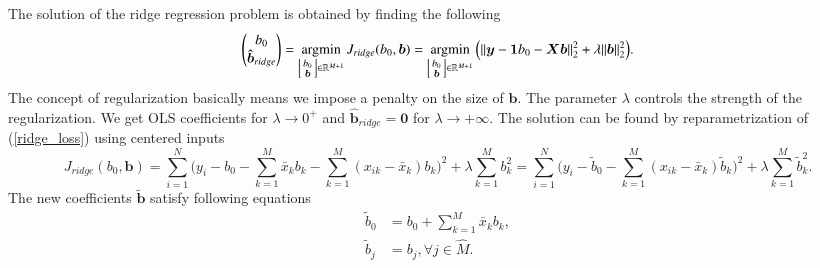 \documentclass[11pt,oneside,czech,american]{book} %
\theoremstyle{plain}
\theoremstyle{definition}
\DeclareMathOperator*{\argmin}{argmin} %
\begin{document}
The solution of the ridge regression problem is obtained by finding the following
\begin{equation}
	\begin{pmatrix}
		b_0 \\
		\bm{\hat{b}}_{ridge}
	\end{pmatrix} = \argmin_{
	\begin{bsmallmatrix}
		b_0 \\
		\bm{b}
	\end{bsmallmatrix} \in \mathbb{R}^{M+1}} J_{ridge}(b_0, \bm{b}) = \argmin_{	\begin{bsmallmatrix}
	b_0 \\
	\bm{b}
\end{bsmallmatrix} \in \mathbb{R}^{M+1}} \Big( \lVert \bm{y} - \bm{1} b_0 -\bm{X}\bm{b}\rVert_{2}^2 + \lambda \lVert \bm{b} \rVert^2_{2} \Big). \label{ridge_regression}
\end{equation}
The concept of regularization basically means we impose a penalty on the size of $\bm{b}$. The parameter $\lambda$ controls the strength of the regularization. We get OLS coefficients for $\lambda \rightarrow 0^{+}$ and $\bm{\hat{b}}_{ridge}=\bm{0}$ for $\lambda \rightarrow +\infty$. The solution can be found by reparametrization of (\ref{ridge_loss}) using centered inputs
\begin{equation}
	J_{ridge}(b_0, \bm{b}) = \sum_{i=1}^{N} \Big(y_i - b_0 - \sum_{k=1}^{M} \bar{x}_k b_k - \sum_{k=1}^{M} (x_{ik} - \bar{x}_k) b_k \Big)^2 + \lambda \sum_{k=1}^{M} b^{2}_k = \sum_{i=1}^{N} \Big(y_i - \tilde{b}_0 - \sum_{k=1}^{M} (x_{ik} - \bar{x}_k) \tilde{b}_k \Big)^2 + \lambda \sum_{k=1}^{M} \tilde{b}^{2}_k.
\end{equation}
The new coefficients $\bm{\tilde{b}}$ satisfy following equations
\begin{equation}
\begin{aligned}
	\tilde{b}_0 &= b_0 + \sum_{k=1}^{M} \bar{x}_k b_k, \\
	\tilde{b}_j &= b_j, \forall j \in \hat{M}.
\end{aligned}
\label{tilde_coefficients}
\end{equation}
\end{document}
